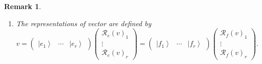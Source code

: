 \documentclass[aps,preprint]{revtex4}
\newtheorem{remark}[theorem]{Remark}
\begin{document}
\begin{remark}
\begin{enumerate}
\item The representations of vector are defined by 
\begin{equation}
v=\left( 
\begin{array}{ccc}
\left\vert e_{1}\right\rangle & \cdots & \left\vert e_{r}\right\rangle%
\end{array}%
\right) \left( 
\begin{array}{c}
\mathcal{R}_{e}\left( v\right) _{1} \\ 
\vdots \\ 
\mathcal{R}_{e}\left( v\right) _{r}%
\end{array}%
\right) =\left( 
\begin{array}{ccc}
\left\vert f_{1}\right\rangle & \cdots & \left\vert f_{r}\right\rangle%
\end{array}%
\right) \left( 
\begin{array}{c}
\mathcal{R}_{f}\left( v\right) _{1} \\ 
\vdots \\ 
\mathcal{R}_{f}\left( v\right) _{r}%
\end{array}%
\right) .
\end{equation}


\end{enumerate}
\end{remark}
\end{document}
